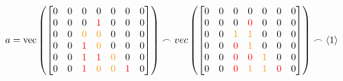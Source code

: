 \documentclass[12pt]{article}
\newcommand{\mathColor}[2]{\color{#1}#2\color{black}}
\newcommand{\gold}{YellowOrange}
\begin{document}
\begin{equation}
a =
\text{vec}\left(\left[\begin{matrix}
\mathColor{black}{0} & \mathColor{black}{0} & \mathColor{black}{0} & \mathColor{black}{0} & \mathColor{black}{0} & \mathColor{black}{0} & \mathColor{black}{0}\\
\mathColor{black}{0} & \mathColor{black}{0} & \mathColor{black}{0} & \mathColor{red}{1}     & \mathColor{black}{0} & \mathColor{black}{0} & \mathColor{black}{0}\\
\mathColor{black}{0} & \mathColor{black}{0} & \mathColor{\gold}{0} & \mathColor{\gold}{0} & \mathColor{black}{0} & \mathColor{black}{0} & \mathColor{black}{0}\\
\mathColor{black}{0} & \mathColor{black}{0} & \mathColor{red}{1}     & \mathColor{\gold}{0} & \mathColor{black}{0} & \mathColor{black}{0} & \mathColor{black}{0}\\
\mathColor{black}{0} & \mathColor{black}{0} & \mathColor{red}{1}     & \mathColor{red}{1}     & \mathColor{\gold}{0} & \mathColor{black}{0} & \mathColor{black}{0}\\
\mathColor{black}{0} & \mathColor{black}{0} & \mathColor{red}{1}     & \mathColor{\gold}{0} & \mathColor{\gold}{0} & \mathColor{red}{1}     & \mathColor{black}{0}\\
\end{matrix}
\right]\right)
\frown vec
\left(\left[
\begin{matrix}
\mathColor{black}{0} & \mathColor{black}{0} & \mathColor{black}{0} & \mathColor{black}{0} & \mathColor{black}{0} & \mathColor{black}{0} & \mathColor{black}{0}\\
\mathColor{black}{0} & \mathColor{black}{0} & \mathColor{black}{0} & \mathColor{red}{0}     & \mathColor{black}{0} & \mathColor{black}{0} & \mathColor{black}{0}\\
\mathColor{black}{0} & \mathColor{black}{0} & \mathColor{\gold}{1} & \mathColor{\gold}{1} & \mathColor{black}{0} & \mathColor{black}{0} & \mathColor{black}{0}\\
\mathColor{black}{0} & \mathColor{black}{0} & \mathColor{red}{0}     & \mathColor{\gold}{1} & \mathColor{black}{0} & \mathColor{black}{0} & \mathColor{black}{0}\\
\mathColor{black}{0} & \mathColor{black}{0} & \mathColor{red}{0}     & \mathColor{red}{0}     & \mathColor{\gold}{1} & \mathColor{black}{0} & \mathColor{black}{0}\\
\mathColor{black}{0} & \mathColor{black}{0} & \mathColor{red}{0}     & \mathColor{\gold}{1} & \mathColor{\gold}{1} & \mathColor{red}{0}     & \mathColor{black}{0}\\
\end{matrix}\right]\right)\frown \left<1\right>
\end{equation}
\end{document}
